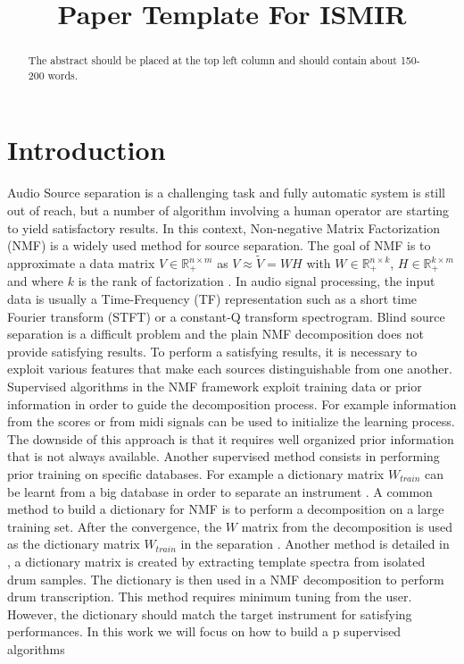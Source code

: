 \documentclass{article}
\title{Paper Template For ISMIR \conferenceyear}
\begin{document}
%
\maketitle
%
\begin{abstract}
The abstract should be placed at the top left column and should contain about 150-200 words.
\end{abstract}
%
\section{Introduction}\label{sec:introduction}

Audio Source separation is a challenging task and fully automatic system is still out of reach, but a number of algorithm involving a human operator are starting to yield satisfactory results. In this context, Non-negative Matrix Factorization (NMF) is a widely used method for source separation. The goal of NMF is to approximate a data matrix $V \in \mathbb{R}_{+}^{n \times m} $ as $V \approx \tilde{V} = WH$ with $W \in \mathbb{R}_{+}^{n \times k}$, $H \in \mathbb{R}_{+}^{k \times m}$ and where $k$ is the rank of factorization \cite{lee99}. In audio signal processing, the input data is usually a Time-Frequency (TF) representation such as a short time Fourier transform (STFT) or a constant-Q transform spectrogram. Blind source separation is a difficult problem and the plain NMF decomposition does not provide satisfying results. To perform a satisfying results, it is necessary to exploit various features that make each sources distinguishable from one another. 
Supervised algorithms in the NMF framework exploit training data or prior information in order to guide the decomposition process. For example information from the scores or from midi signals \cite{EwertM12} can be used to initialize the learning process. The downside of this approach is that it requires well organized prior information that is not always available. Another supervised method consists in performing prior training on specific databases. For example a dictionary matrix $W_{train}$ can be learnt from a big database in order to separate an instrument \cite{jaureguiberry2011adaptation,wudrum}. A common method to build a dictionary for NMF is to perform a decomposition on a large training set. After the convergence, the $W$ matrix from the decomposition is used as the dictionary matrix $W_{train}$ in the separation \cite{jaureguiberry2011adaptation}. Another method is detailed in \cite{wudrum}, a dictionary matrix is created by extracting template spectra from isolated drum samples. The dictionary is then used in a NMF decomposition to perform drum transcription. This method requires minimum tuning from the user. However, the dictionary should match the target instrument for satisfying performances. In this work we will focus on how to build a p supervised algorithms 
\end{document}

